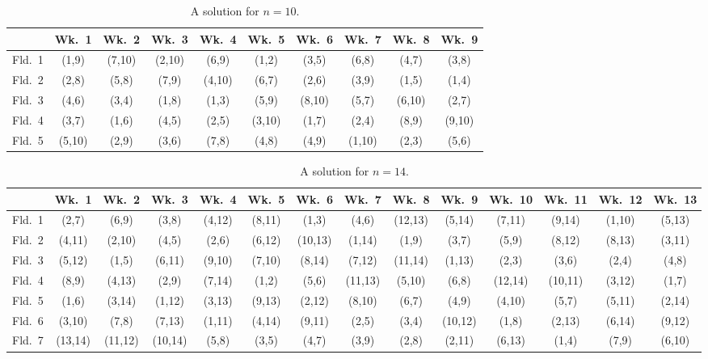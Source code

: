 \documentclass[a4paper]{article}
\begin{document}
\begin{table}[H]
\begin{center}
\begin{tabular}{|l||c|c|c|c|c|c|c|c|c|}
\hline
&Wk.~1&Wk.~2&Wk.~3&Wk.~4&Wk.~5&Wk.~6&Wk.~7&Wk.~8&Wk.~9\\
\hline\hline
Fld.~1&(1,9)&(7,10)&(2,10)&(6,9)&(1,2)&(3,5)&(6,8)&(4,7)&(3,8)\\\hline
Fld.~2&(2,8)&(5,8)&(7,9)&(4,10)&(6,7)&(2,6)&(3,9)&(1,5)&(1,4)\\\hline
Fld.~3&(4,6)&(3,4)&(1,8)&(1,3)&(5,9)&(8,10)&(5,7)&(6,10)&(2,7)\\\hline
Fld.~4&(3,7)&(1,6)&(4,5)&(2,5)&(3,10)&(1,7)&(2,4)&(8,9)&(9,10)\\\hline
Fld.~5&(5,10)&(2,9)&(3,6)&(7,8)&(4,8)&(4,9)&(1,10)&(2,3)&(5,6)\\\hline
\end{tabular}
\end{center}
\caption{A solution for $n=10$.}
\label{tab10}
\end{table}

\begin{table}[H]
\begin{center}
\begin{tabular}{|l||c|c|c|c|c|c|c|c|c|c|c|c|c|}
\hline
&Wk.~1&Wk.~2&Wk.~3&Wk.~4&Wk.~5&Wk.~6&Wk.~7&Wk.~8&Wk.~9&Wk.~10&Wk.~11&Wk.~12&Wk.~13\\
\hline\hline
Fld.~1&(2,7)&(6,9)&(3,8)&(4,12)&(8,11)&(1,3)&(4,6)&(12,13)&(5,14)&(7,11)&(9,14)&(1,10)&(5,13)\\\hline
Fld.~2&(4,11)&(2,10)&(4,5)&(2,6)&(6,12)&(10,13)&(1,14)&(1,9)&(3,7)&(5,9)&(8,12)&(8,13)&(3,11)\\\hline
Fld.~3&(5,12)&(1,5)&(6,11)&(9,10)&(7,10)&(8,14)&(7,12)&(11,14)&(1,13)&(2,3)&(3,6)&(2,4)&(4,8)\\\hline
Fld.~4&(8,9)&(4,13)&(2,9)&(7,14)&(1,2)&(5,6)&(11,13)&(5,10)&(6,8)&(12,14)&(10,11)&(3,12)&(1,7)\\\hline
Fld.~5&(1,6)&(3,14)&(1,12)&(3,13)&(9,13)&(2,12)&(8,10)&(6,7)&(4,9)&(4,10)&(5,7)&(5,11)&(2,14)\\\hline
Fld.~6&(3,10)&(7,8)&(7,13)&(1,11)&(4,14)&(9,11)&(2,5)&(3,4)&(10,12)&(1,8)&(2,13)&(6,14)&(9,12)\\\hline
Fld.~7&(13,14)&(11,12)&(10,14)&(5,8)&(3,5)&(4,7)&(3,9)&(2,8)&(2,11)&(6,13)&(1,4)&(7,9)&(6,10)\\\hline
\end{tabular}
\end{center}
\caption{A solution for $n=14$.}
\label{tab14}
\end{table}
\end{document}
